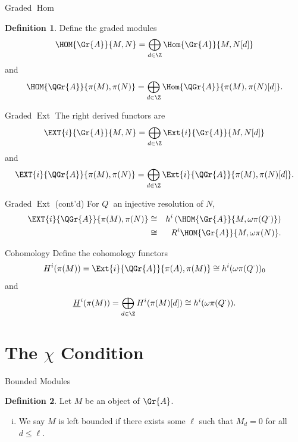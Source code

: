 \documentclass{beamer}
\theoremstyle{definition}
\newtheorem{defn}{Definition}
\begin{document}
\begin{frame}{Graded $\operatorname{Hom}$}
  \begin{defn}
    Define the graded modules
  $$\HOM{\Gr{A}}{M,N} = \bigoplus_{d \in \Z} \Hom{\Gr{A}}{M, N[d]}$$ 
  and 
  $$\HOM{\QGr{A}}{\pi(M), \pi(N)} = \bigoplus_{d \in \Z} \Hom{\QGr{A}}{\pi(M), \pi(N)[d]}.$$
  \end{defn}
\end{frame}

\begin{frame}{Graded $\operatorname{Ext}$}
  The right derived functors are
  $$\EXT{i}{\Gr{A}}{M,N} = \bigoplus_{d \in \Z}\Ext{i}{\Gr{A}}{M,N[d]}$$
  and
  $$\EXT{i}{\QGr{A}}{\pi(M),\pi(N)} = \bigoplus_{d \in \Z}\Ext{i}{\QGr{A}}{\pi(M),\pi(N)[d]}.$$
\end{frame}

\begin{frame}{Graded $\operatorname{Ext}$ (cont'd)}
  For $Q^\cdot$ an injective resolution of $N$, 
  \begin{eqnarray*}
    \EXT{i}{\QGr{A}}{\pi(M), \pi(N)} 
    &\cong& h^i\left(\HOM{\Gr{A}}{M, \omega\pi(Q^\cdot)}\right)\\
    &\cong& R^i\HOM{\Gr{A}}{M, \omega\pi(N)}.
  \end{eqnarray*}
\end{frame}

\begin{frame}{Cohomology}
  Define the cohomology functors
  $$H^i(\pi(M)) = \Ext{i}{\QGr{A}}{\pi(A), \pi(M)} \cong h^i(\omega\pi(Q^\cdot))_0$$
  and
  $$\underline{H}^i(\pi(M)) = \bigoplus_{d \in \Z} H^i(\pi(M)[d]) \cong h^i(\omega\pi(Q^\cdot)).$$
\end{frame}



\section{The $\chi$ Condition}

\begin{frame}{Bounded Modules}
  \begin{defn}
    Let $M$ be an object of $\Gr{A}$.
    \begin{enumerate}[(i)]
    \item
      We say $M$ is left bounded if there exists some $\ell$ such that $M_d = 0$ for all $d \leq \ell$.
    \end{enumerate}
  \end{defn}
\end{frame}
\end{document}
